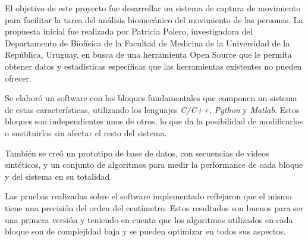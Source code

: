 El objetivo de este proyecto fue desarrollar un sistema de captura de movimiento para facilitar la tarea del análisis biomecánico del movimiento de las personas. La propuesta inicial fue realizada por Patricia Polero, investigadora del Departamento de Biofísica de la Facultad de Medicina de la Universidad de la República, Uruguay, en busca de una herramienta Open Source que le permita obtener datos y estadísticas específicas que las herramientas existentes no pueden ofrecer.

\vspace{3 mm}

Se elaboró un software con los bloques fundamentales que componen un sistema de estas características, utilizando los lenguajes \emph{C/C++}, \emph{Python} y \emph{Matlab}. Estos bloques son independientes unos de otros, lo que da la posibilidad de modificarlos o sustituirlos sin afectar el resto del sistema.

\vspace{3 mm}

También se creó un prototipo de base de datos, con secuencias de videos sintéticos, y un conjunto de algoritmos para medir la performance de cada bloque y del sistema en su totalidad.

\vspace{3 mm}

Las pruebas realizadas sobre el software implementado reflejaron que el mismo tiene una precisión del orden del centímetro. Estos resultados son buenos para ser una primera versión y teniendo en cuenta que los algoritmos utilizados en cada bloque son de complejidad baja y se pueden optimizar en todos sus aspectos.
